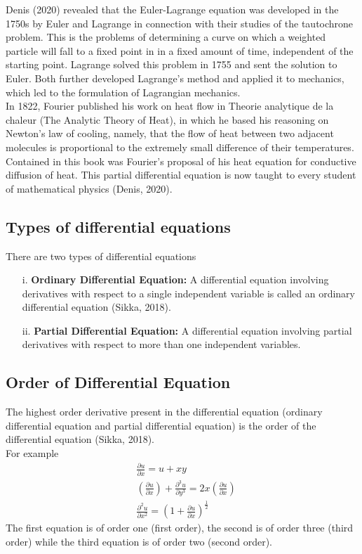 \documentclass[12pt]{report}
\begin{document}
Denis (2020) revealed that the Euler-Lagrange equation was developed in the 1750s by Euler and Lagrange in connection with their studies of the tautochrone problem. This is the problems of determining a curve on which a weighted particle will fall to a fixed point in in a fixed amount of time, independent of the starting point. Lagrange solved this problem in 1755 and sent the solution to Euler. Both further developed Lagrange's method and applied it to mechanics, which led to the formulation of Lagrangian mechanics.\\

In 1822, Fourier published his work on heat flow in Theorie analytique de la chaleur (The Analytic Theory of Heat), in which he based his reasoning on Newton's law of cooling, namely, that the flow of heat between two adjacent molecules is proportional to the extremely small difference of their temperatures. Contained in this book was Fourier's proposal of his heat equation for conductive diffusion of heat. This partial differential equation is now taught to every student of mathematical physics (Denis, 2020).

\subsection {Types of differential equations}
There are two types of differential equations
\begin{enumerate}
	\item[i.] \textbf{Ordinary Differential Equation:} A differential equation involving derivatives with respect to a single independent variable is called an ordinary differential equation (Sikka, 2018).
  \item[ii.] \textbf{Partial Differential Equation:} A differential equation involving partial derivatives with respect to more than one independent variables. 
\end{enumerate}
\subsection{Order of Differential Equation}
\qquad The highest order derivative present in the differential equation (ordinary differential equation and partial differential equation) is the order of the differential equation (Sikka, 2018).
\\
For example
\begin{align*}
& \frac{\partial u}{\partial x}=u+xy \tag{i}\\
& \left (\frac{\partial u}{\partial x}\right)+ \frac{\partial^3u}{\partial y^3}=2x\left(\frac{\partial u}{\partial x}\right) \tag{ii} \\
& \frac{\partial^2u}{\partial x^2}=\left(1+\frac{\partial u}{\partial x}\right)^{\frac{1}{2}}\tag{iii}
\end{align*}
The first equation is of order one (first order), the second is of order three (third order) while the third equation is of order two (second order).
\end{document}
